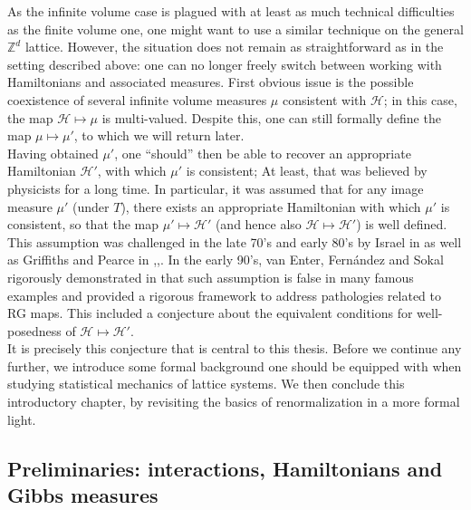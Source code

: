 \documentclass[12pt]{article}
\renewcommand{\H}{\mathcal{H}}
\newcommand{\Z}{\mathbb{Z}}
\newcommand{\1}{\mathbbm{1}}
\newcommand{\5}{\vspace{0.5cm}}
\theoremstyle{definition}
\begin{document}
As the infinite volume case is plagued with at least as much technical difficulties as the finite volume one, one might want to use a similar technique on the general $\Z^d$ lattice. However, the situation does not remain as straightforward as in the setting described above: one can no longer freely switch between working with Hamiltonians and associated measures. First obvious issue is the possible coexistence of several infinite volume measures $\mu$ consistent with $\H$; in this case, the map $\H\mapsto\mu$ is multi-valued. Despite this, one can still formally define the map $\mu\mapsto\mu'$, to which we will return later. \\

Having obtained $\mu'$, one ``should'' then be able to recover an appropriate Hamiltonian $\H'$, with which $\mu'$ is consistent; At least, that was believed by physicists for a long time. In particular, it was assumed that for any image measure $\mu'$ (under $T$), there exists an appropriate Hamiltonian with which $\mu'$ is consistent, so that the map $\mu'\mapsto\H'$ (and hence also $\H\mapsto\H'$) is well defined. This assumption was challenged in the late 70's and early 80's by Israel in \cite{Isr} as well as Griffiths and Pearce in \cite{GP1},\cite{GP2},\cite{Grif}. In the early 90's, van Enter, Fern\'andez and Sokal rigorously demonstrated in \cite{EFS} that such assumption is false in many famous examples and provided a rigorous framework to address pathologies related to RG maps. This included a conjecture about the equivalent conditions for well-posedness of $\H\mapsto\H'$. \\

It is precisely this conjecture that is central to this thesis. Before we continue any further, we introduce some formal background one should be equipped with when studying statistical mechanics of lattice systems. We then conclude this introductory chapter, by revisiting the basics of renormalization in a more formal light.


\subsection{Preliminaries: interactions, Hamiltonians and Gibbs measures}
\end{document}
